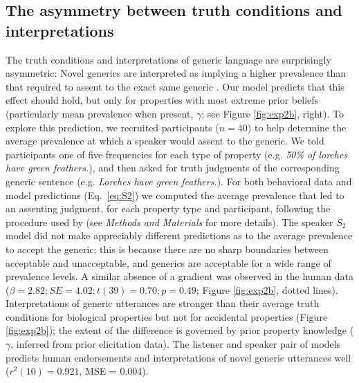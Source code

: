\documentclass{pnastwo}
\begin{document}
\begin{article}
\subsection{The asymmetry between truth conditions and interpretations}
The truth conditions and interpretations of generic language are surprisingly asymmetric: Novel generics are interpreted as implying a higher prevalence than that required to assent to the exact same generic \cite{Cimpian2010}.
Our model predicts that this effect should hold, but only for properties with most extreme prior beliefs (particularly mean prevalence when present, $\gamma$; see Figure \ref{fig:exp2b}, right).
To explore this prediction, we recruited participants ($n=40$) to help determine the average prevalence at which a speaker would assent to the generic. 
We told participants one of five frequencies for each type of property (e.g. \emph{50\% of lorches have green feathers.}), and then asked for truth judgments of the corresponding generic sentence (e.g. \emph{Lorches have green feathers.}). 
For both behavioral data and model predictions (Eq.~\ref{eq:S2})  we computed the average prevalence that led to an assenting judgment, for each property type and participant, following the procedure used by \cite{Cimpian2010} (see {\it Methods and Materials} for more details).
%
%
The speaker $S_2$ model did not make appreciably different predictions as to the average prevalence to accept the generic; this is because there are no sharp boundaries between acceptable and unacceptable, and generics are acceptable for a wide range of prevalence levels. 
A similar absence of a gradient was observed in the human data ($\beta = 2.82; SE = 4.02; t(39) = 0.70; p = 0.49$; Figure \ref{fig:exp2b}, dotted lines). 
Interpretations of generic utterances are stronger than their average truth conditions for biological properties but not for accidental properties (Figure \ref{fig:exp2b}); the extent of the difference is governed by prior property knowledge ($\gamma$, inferred from prior elicitation data).
The listener and speaker pair of models predicts human endorsements and interpretations of novel generic utterances well ($r^2(10) = 0.921$, MSE = 0.004). 


\end{article}
\end{document}
